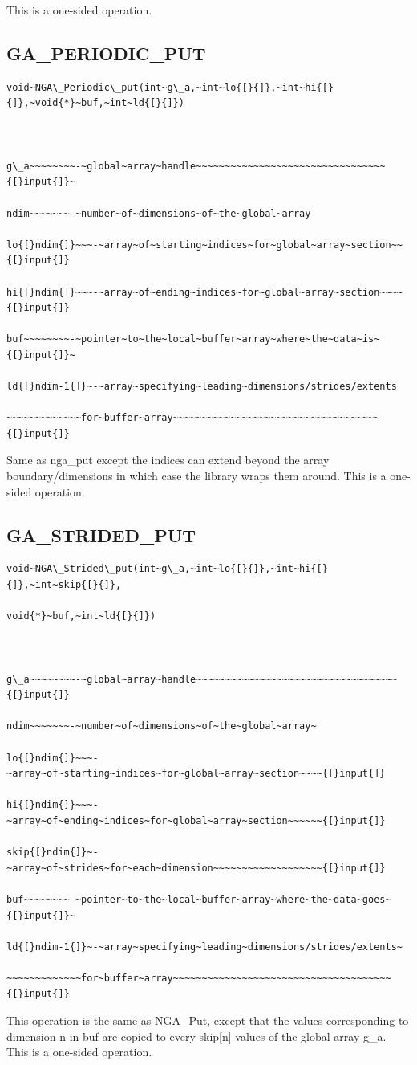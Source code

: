 This is a one-sided operation. 


\subsection*{\label{sub:GA_PERIODIC_PUT}GA\_PERIODIC\_PUT}
\begin{verbatim}
void~NGA\_Periodic\_put(int~g\_a,~int~lo{[}{]},~int~hi{[}{]},~void{*}~buf,~int~ld{[}{]})



g\_a~~~~~~~~-~global~array~handle~~~~~~~~~~~~~~~~~~~~~~~~~~~~~~~~~{[}input{]}~

ndim~~~~~~~-~number~of~dimensions~of~the~global~array

lo{[}ndim{]}~~~-~array~of~starting~indices~for~global~array~section~~{[}input{]}

hi{[}ndim{]}~~~-~array~of~ending~indices~for~global~array~section~~~~{[}input{]}

buf~~~~~~~~-~pointer~to~the~local~buffer~array~where~the~data~is~{[}input{]}~

ld{[}ndim-1{]}~-~array~specifying~leading~dimensions/strides/extents

~~~~~~~~~~~~~for~buffer~array~~~~~~~~~~~~~~~~~~~~~~~~~~~~~~~~~~~~{[}input{]}
\end{verbatim}
Same as nga\_put except the indices can extend beyond the array boundary/dimensions
in which case the library wraps them around. This is a one-sided operation. 


\subsection*{\label{sub:GA_STRIDED_PUT}GA\_STRIDED\_PUT}
\begin{verbatim}
void~NGA\_Strided\_put(int~g\_a,~int~lo{[}{]},~int~hi{[}{]},~int~skip{[}{]},

void{*}~buf,~int~ld{[}{]})



g\_a~~~~~~~~-~global~array~handle~~~~~~~~~~~~~~~~~~~~~~~~~~~~~~~~~~~{[}input{]}

ndim~~~~~~~-~number~of~dimensions~of~the~global~array~

lo{[}ndim{]}~~~-~array~of~starting~indices~for~global~array~section~~~~{[}input{]}

hi{[}ndim{]}~~~-~array~of~ending~indices~for~global~array~section~~~~~~{[}input{]}

skip{[}ndim{]}~-~array~of~strides~for~each~dimension~~~~~~~~~~~~~~~~~~~{[}input{]}

buf~~~~~~~~-~pointer~to~the~local~buffer~array~where~the~data~goes~{[}input{]}~

ld{[}ndim-1{]}~-~array~specifying~leading~dimensions/strides/extents~

~~~~~~~~~~~~~for~buffer~array~~~~~~~~~~~~~~~~~~~~~~~~~~~~~~~~~~~~~~{[}input{]}
\end{verbatim}
This operation is the same as NGA\_Put, except that the values corresponding
to dimension n in buf are copied to every skip{[}n{]} values of the
global array g\_a. This is a one-sided operation. 


